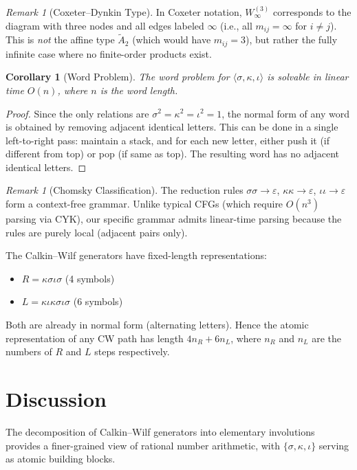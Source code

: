 \documentclass[11pt]{article}
\theoremstyle{plain}
\newtheorem{corollary}[theorem]{Corollary}
\theoremstyle{definition}
\theoremstyle{remark}
\newtheorem{remark}[theorem]{Remark}
\begin{document}
\begin{remark}[Coxeter--Dynkin Type]
In Coxeter notation, $W_\infty^{(3)}$ corresponds to the diagram with three nodes
and all edges labeled $\infty$ (i.e., all $m_{ij} = \infty$ for $i \neq j$).
This is \emph{not} the affine type $\tilde{A}_2$ (which would have $m_{ij} = 3$),
but rather the fully infinite case where no finite-order products exist.
\end{remark}

\begin{corollary}[Word Problem]
The word problem for $\langle \sigma, \kappa, \iota \rangle$ is solvable in
linear time $O(n)$, where $n$ is the word length.
\end{corollary}

\begin{proof}
Since the only relations are $\sigma^2 = \kappa^2 = \iota^2 = 1$, the normal
form of any word is obtained by removing adjacent identical letters. This
can be done in a single left-to-right pass: maintain a stack, and for each
new letter, either push it (if different from top) or pop (if same as top).
The resulting word has no adjacent identical letters.
\end{proof}

\begin{remark}[Chomsky Classification]
The reduction rules $\sigma\sigma \to \varepsilon$, $\kappa\kappa \to \varepsilon$,
$\iota\iota \to \varepsilon$ form a context-free grammar. Unlike typical CFGs
(which require $O(n^3)$ parsing via CYK), our specific grammar admits linear-time
parsing because the rules are purely local (adjacent pairs only).
\end{remark}

The Calkin--Wilf generators have fixed-length representations:
\begin{itemize}
\item $R = \kappa\sigma\iota\sigma$ (4 symbols)
\item $L = \kappa\iota\kappa\sigma\iota\sigma$ (6 symbols)
\end{itemize}
Both are already in normal form (alternating letters). Hence the atomic
representation of any CW path has length $4 n_R + 6 n_L$, where $n_R$ and $n_L$
are the numbers of $R$ and $L$ steps respectively.

\section{Discussion}

The decomposition of Calkin--Wilf generators into elementary involutions
provides a finer-grained view of rational number arithmetic, with
$\{\sigma, \kappa, \iota\}$ serving as atomic building blocks.
\end{document}
